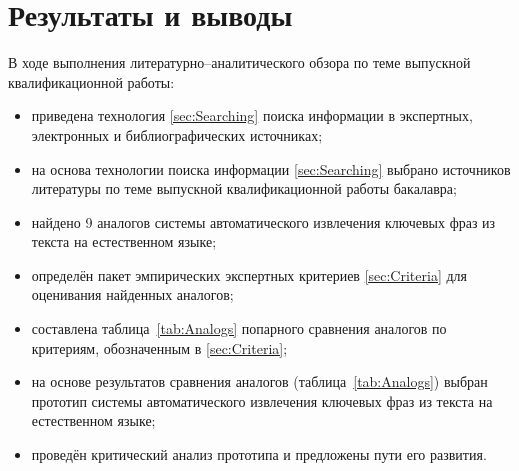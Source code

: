 \section{Результаты и выводы}
В ходе выполнения литературно--аналитического обзора по теме
выпускной квалификационной работы:
\begin{itemize}
  \item приведена технология \ref{sec:Searching} поиска информации в
экспертных, электронных и библиографических источниках;
  \item на основа технологии поиска информации \ref{sec:Searching}
выбрано \totalbibs источников литературы по теме выпускной
квалификационной работы бакалавра;
  \item найдено 9 аналогов системы автоматического извлечения
ключевых фраз из текста на естественном языке;
  \item определён пакет эмпирических экспертных критериев
\ref{sec:Criteria} для оценивания найденных аналогов;
  \item составлена таблица~\ref{tab:Analogs} попарного сравнения
аналогов по критериям, обозначенным в \ref{sec:Criteria};
  \item на основе результатов сравнения аналогов
(таблица~\ref{tab:Analogs}) выбран прототип системы автоматического
извлечения ключевых фраз из текста на естественном языке;
  \item проведён критический анализ прототипа и предложены пути его
развития.
\end{itemize}
